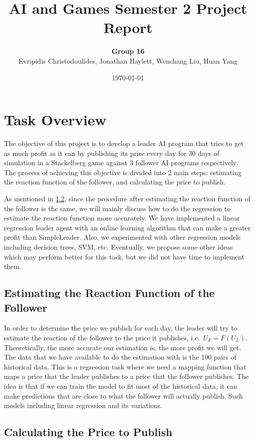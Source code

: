 \documentclass[a4paper]{article}
\title{AI and Games Semester 2 Project Report}
\author{\textbf{Group 16} \\ Evripidis Christodoulides, Jonathan Haylett, Wenchang Liu,
Huan Yang}
\date{\today}
\begin{document}
\maketitle
\tableofcontents

\pagebreak
\section{Task Overview}
The objective of this project is to develop a leader AI program that tries to
get as much profit as it can by publishing its price every day for 30 days of
simulation in a Stackelberg game against 3 follower AI programs respectively.
The process of achieving this objective is divided into 2 main steps: estimating
the reaction function of the follower, and calculating the price to publish.

As mentioned in \cref{sub:calculating_price}, since the procedure after
estimating the reaction function of the follower is the same, we will mainly
discuss how to do the regression to estimate the reaction function more
accurately.
We have implemented a linear regression leader agent with an online learning
algorithm that can make a greater profit than SimpleLeader.
Also, we experimented with other regression models including decision trees,
SVM, etc.
Eventually, we propose some other ideas which may perform better for this
task, but we did not have time to implement them.


\subsection{Estimating the Reaction Function of the Follower}
In order to determine the price we publish for each day, the leader will try to
estimate the reaction of the follower to the price it publishes, i.e.\
$U_F=F(U_L)$.
Theoretically, the more accurate our estimation is, the more profit we will get.
The data that we have available to do the estimation with is the 100 pairs of
historical data.
This is a regression task where we need a mapping function that maps a price
that the leader publishes to a price that the follower publishes.
The idea is that if we can train the model to fit most of the historical data,
it can make predictions that are close to what the follower will actually
publish.
Such models including linear regression and its variations.

\subsection{Calculating the Price to Publish}%
\label{sub:calculating_price}
\end{document}
